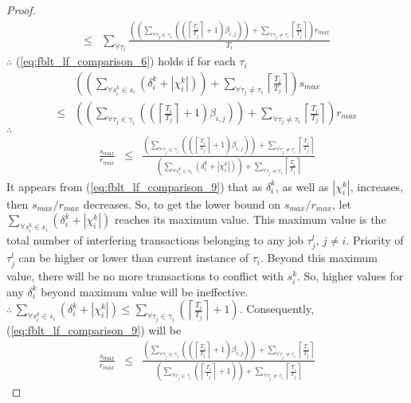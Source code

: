 \documentclass[prodmode,acmtecs]{acmsmall}
\begin{document}
\begin{compactenum}
\begin{proof}
\begin{eqnarray}
\le & \sum_{\forall\tau_{i}}\frac{\left(\left(\sum_{\forall\tau_{j}\in\gamma_{i}}\left(\left(\left\lceil \frac{T_{i}}{T_{j}}\right\rceil +1\right)\beta_{i,j}\right)\right)+\sum_{\forall\tau_{j}\neq\tau_{i}}\left\lceil \frac{T_{i}}{T_{j}}\right\rceil \right)r_{max}}{T_{i}}\nonumber 
\end{eqnarray}
$\therefore$ (\ref{eq:fblt_lf_comparison_6}) holds if for each $\tau_{i}$
\begin{eqnarray}
 & \left(\left(\sum_{\forall s_{i}^{k}\in s_{i}}\left(\delta_{i}^{k}+|\chi_{i}^{k}|\right)\right)+\sum_{\forall\tau_{j}\neq\tau_{i}}\left\lceil \frac{T_{i}}{T_{j}}\right\rceil \right)s_{max}\label{eq:fblt_lf_comparison_7}\\
\le & \left(\left(\sum_{\forall\tau_{j}\in\gamma_{i}}\left(\left(\left\lceil \frac{T_{i}}{T_{j}}\right\rceil +1\right)\beta_{i,j}\right)\right)+\sum_{\forall\tau_{j}\neq\tau_{i}}\left\lceil \frac{T_{i}}{T_{j}}\right\rceil \right)r_{max}\nonumber 
\end{eqnarray}
$\therefore$
\begin{eqnarray}
\frac{s_{max}}{r_{max}} & \le & \frac{\left(\sum_{\forall\tau_{j}\in\gamma_{i}}\left(\left(\left\lceil \frac{T_{i}}{T_{j}}\right\rceil +1\right)\beta_{i,j}\right)\right)+\sum_{\forall\tau_{j}\neq\tau_{i}}\left\lceil \frac{T_{i}}{T_{j}}\right\rceil }{\left(\sum_{\forall s_{i}^{k}\in s_{i}}\left(\delta_{i}^{k}+|\chi_{i}^{k}|\right)\right)+\sum_{\forall\tau_{j}\neq\tau_{i}}\left\lceil \frac{T_{i}}{T_{j}}\right\rceil }\label{eq:fblt_lf_comparison_9}
\end{eqnarray}
It appears from (\ref{eq:fblt_lf_comparison_9}) that as $\delta_{i}^{k}$,
as well as $|\chi_{i}^{k}|$, increases, then $s_{max}/r_{max}$ decreases.
So, to get the lower bound on $s_{max}/r_{max}$, let $\sum_{\forall s_{i}^{k}\in s_{i}}\left(\delta_{i}^{k}+|\chi_{i}^{k}|\right)$
reaches its maximum value. This maximum value is the total number
of interfering transactions belonging to any job $\tau_{j}^{l},\, j\ne i$.
Priority of $\tau_{j}^{l}$ can be higher or lower than current instance
of $\tau_{i}$. Beyond this maximum value, there will be no more transactions
to conflict with $s_{i}^{k}$. So, higher values for any $\delta_{i}^{k}$
beyond maximum value will be ineffective. $\therefore\,\sum_{\forall s_{i}^{k}\in s_{i}}\left(\delta_{i}^{k}+|\chi_{i}^{k}|\right)\le\sum_{\forall\tau_{j}\in\gamma_{i}}\left(\left\lceil \frac{T_{i}}{T_{j}}\right\rceil +1\right)$.
Consequently, (\ref{eq:fblt_lf_comparison_9}) will be 
\begin{eqnarray}
\frac{s_{max}}{r_{max}} & \le & \frac{\left(\sum_{\forall\tau_{j}\in\gamma_{i}}\left(\left(\left\lceil \frac{T_{i}}{T_{j}}\right\rceil +1\right)\beta_{i,j}\right)\right)+\sum_{\forall\tau_{j}\neq\tau_{i}}\left\lceil \frac{T_{i}}{T_{j}}\right\rceil }{\left(\sum_{\forall\tau_{j}\in\gamma_{i}}\left(\left\lceil \frac{T_{i}}{T_{j}}\right\rceil +1\right)\right)+\sum_{\forall\tau_{j}\neq\tau_{i}}\left\lceil \frac{T_{i}}{T_{j}}\right\rceil }\label{eq:fblt_lf_comparison_10}

\end{eqnarray}
\end{proof}
\end{compactenum}
\end{document}
